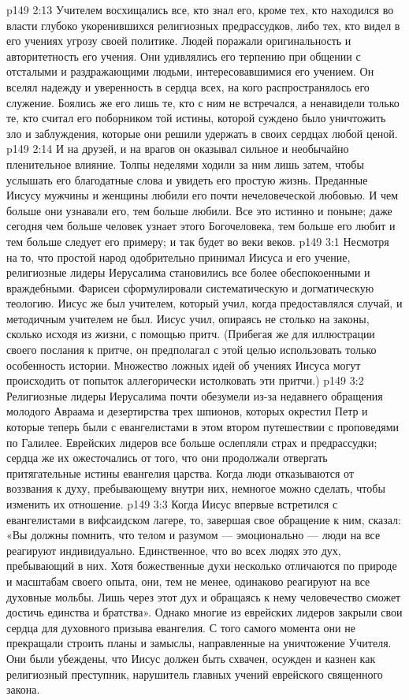 \vs p149 2:13 Учителем восхищались все, кто знал его, кроме тех, кто находился во власти глубоко укоренившихся религиозных предрассудков, либо тех, кто видел в его учениях угрозу своей политике. Людей поражали оригинальность и авторитетность его учения. Они удивлялись его терпению при общении с отсталыми и раздражающими людьми, интересовавшимися его учением. Он вселял надежду и уверенность в сердца всех, на кого распространялось его служение. Боялись же его лишь те, кто с ним не встречался, а ненавидели только те, кто считал его поборником той истины, которой суждено было уничтожить зло и заблуждения, которые они решили удержать в своих сердцах любой ценой.
\vs p149 2:14 И на друзей, и на врагов он оказывал сильное и необычайно пленительное влияние. Толпы неделями ходили за ним лишь затем, чтобы услышать его благодатные слова и увидеть его простую жизнь. Преданные Иисусу мужчины и женщины любили его почти нечеловеческой любовью. И чем больше они узнавали его, тем больше любили. Все это истинно и поныне; даже сегодня чем больше человек узнает этого Богочеловека, тем больше его любит и тем больше следует его примеру; и так будет во веки веков.
\vs p149 3:1 Несмотря на то, что простой народ одобрительно принимал Иисуса и его учение, религиозные лидеры Иерусалима становились все более обеспокоенными и враждебными. Фарисеи сформулировали систематическую и догматическую теологию. Иисус же был учителем, который учил, когда предоставлялся случай, и методичным учителем не был. Иисус учил, опираясь не столько на законы, сколько исходя из жизни, с помощью притч. (Прибегая же для иллюстрации своего послания к притче, он предполагал с этой целью использовать только  особенность истории. Множество ложных идей об учениях Иисуса могут происходить от попыток аллегорически истолковать эти притчи.)
\vs p149 3:2 Религиозные лидеры Иерусалима почти обезумели из\hyp{}за недавнего обращения молодого Авраама и дезертирства трех шпионов, которых окрестил Петр и которые теперь были с евангелистами в этом втором путешествии с проповедями по Галилее. Еврейских лидеров все больше ослепляли страх и предрассудки; сердца же их ожесточались от того, что они продолжали отвергать притягательные истины евангелия царства. Когда люди отказываются от воззвания к духу, пребывающему внутри них, немногое можно сделать, чтобы изменить их отношение.
\vs p149 3:3 Когда Иисус впервые встретился с евангелистами в вифсаидском лагере, то, завершая свое обращение к ним, сказал: «Вы должны помнить, что телом и разумом --- эмоционально --- люди на все реагируют индивидуально. Единственное, что во всех людях  это дух, пребывающий в них. Хотя божественные духи несколько отличаются по природе и масштабам своего опыта, они, тем не менее, одинаково реагируют на все духовные мольбы. Лишь через этот дух и обращаясь к нему человечество сможет достичь единства и братства». Однако многие из еврейских лидеров закрыли свои сердца для духовного призыва евангелия. С того самого момента они не прекращали строить планы и замыслы, направленные на уничтожение Учителя. Они были убеждены, что Иисус должен быть схвачен, осужден и казнен как религиозный преступник, нарушитель главных учений еврейского священного закона.
